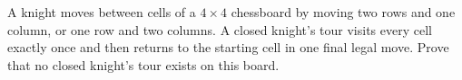 A knight moves between cells of a $4\times4$ chessboard by moving two rows and one column, or one row and two columns. A closed knight's tour visits every cell exactly once and then returns to the starting cell in one final legal move. Prove that no closed knight's tour exists on this board.
